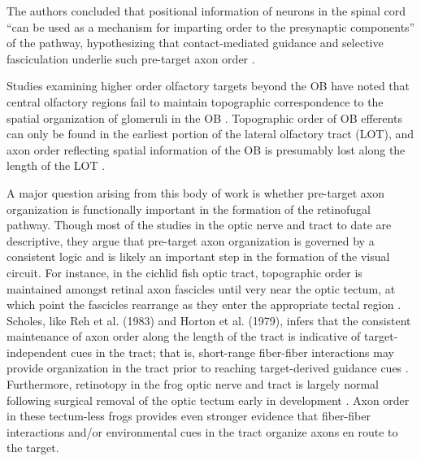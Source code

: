 \label{sec:TractOrderIndependOfTargeting}
The authors concluded that positional information of neurons in the spinal cord “can be used as a mechanism for imparting order to the presynaptic components” of the pathway, hypothesizing that contact-mediated guidance and selective fasciculation underlie such pre-target axon order \cite{nornes1980pattern}. 


Studies examining higher order olfactory targets beyond the OB have noted that central olfactory regions fail to maintain topographic correspondence to the spatial organization of glomeruli in the OB \cite{luskin1982distribution,sosulski2011distinct}.
Topographic order of OB efferents can only be found in the earliest portion of the lateral olfactory tract (LOT), and axon order reflecting spatial information of the OB is presumably lost along the length of the LOT \cite{price1975observation}.


A major question arising from this body of work is whether pre-target axon organization is functionally important in the formation of the retinofugal pathway.
Though most of the studies in the optic nerve and tract to date are descriptive, they argue that pre-target axon organization is governed by a consistent logic and is likely an important step in the formation of the visual circuit.
For instance, in the cichlid fish optic tract, topographic order is maintained amongst retinal axon fascicles until very near the optic tectum, at which point the fascicles rearrange as they enter the appropriate tectal region \cite{scholes1979nerve}.
Scholes, like Reh et al. (1983) and Horton et al. (1979), infers that the consistent maintenance of axon order along the length of the tract is indicative of target-independent cues in the tract; that is, short-range fiber-fiber interactions may provide organization in the tract prior to reaching target-derived guidance cues \cite{scholes1979nerve}.
Furthermore, retinotopy in the frog optic nerve and tract is largely normal following surgical removal of the optic tectum early in development \cite{reh1983organization}.
Axon order in these tectum-less frogs provides even stronger evidence that fiber-fiber interactions and/or environmental cues in the tract organize axons en route to the target.

